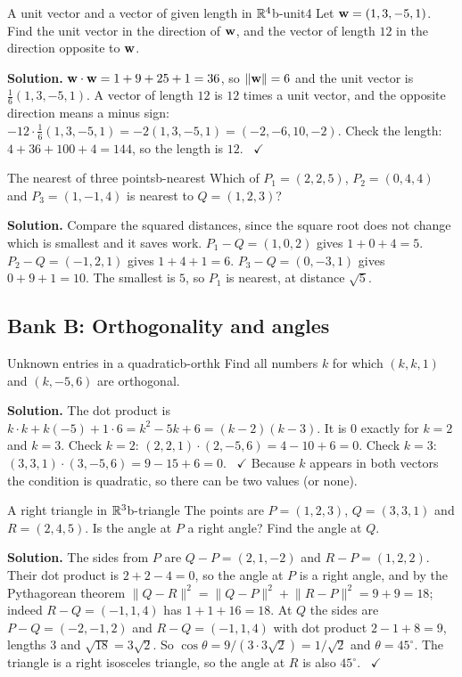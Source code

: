 \documentclass[11pt]{article}
\begin{document}
\begin{exmp}{A unit vector and a vector of given length in $\mathbb{R}^4$}{b-unit4}
Let $\mathbf{w}=(1,3,-5,1)$. Find the unit vector in the direction of $\mathbf{w}$, and the vector of length $12$ in the direction opposite to $\mathbf{w}$.

\textbf{Solution.} $\mathbf{w}\cdot\mathbf{w}=1+9+25+1=36$, so $\lVert\mathbf{w}\rVert=6$ and the unit vector is $\tfrac16(1,3,-5,1)$. A vector of length $12$ is $12$ times a unit vector, and the opposite direction means a minus sign: $-12\cdot\tfrac16(1,3,-5,1)=-2(1,3,-5,1)=(-2,-6,10,-2)$. Check the length: $4+36+100+4=144$, so the length is $12$. \ $\checkmark$
\end{exmp}

\begin{exmp}{The nearest of three points}{b-nearest}
Which of $P_1=(2,2,5)$, $P_2=(0,4,4)$ and $P_3=(1,-1,4)$ is nearest to $Q=(1,2,3)$?

\textbf{Solution.} Compare the squared distances, since the square root does not change which is smallest and it saves work. $P_1-Q=(1,0,2)$ gives $1+0+4=5$. $P_2-Q=(-1,2,1)$ gives $1+4+1=6$. $P_3-Q=(0,-3,1)$ gives $0+9+1=10$. The smallest is $5$, so $P_1$ is nearest, at distance $\sqrt5$.
\end{exmp}

\subsection*{Bank B: Orthogonality and angles}
\begin{exmp}{Unknown entries in a quadratic}{b-orthk}
Find all numbers $k$ for which $(k,k,1)$ and $(k,-5,6)$ are orthogonal.

\textbf{Solution.} The dot product is $k\cdot k+k(-5)+1\cdot6=k^2-5k+6=(k-2)(k-3)$. It is $0$ exactly for $k=2$ and $k=3$. Check $k=2$: $(2,2,1)\cdot(2,-5,6)=4-10+6=0$. Check $k=3$: $(3,3,1)\cdot(3,-5,6)=9-15+6=0$. \ $\checkmark$ Because $k$ appears in both vectors the condition is quadratic, so there can be two values (or none).
\end{exmp}

\begin{exmp}{A right triangle in $\mathbb{R}^3$}{b-triangle}
The points are $P=(1,2,3)$, $Q=(3,3,1)$ and $R=(2,4,5)$. Is the angle at $P$ a right angle? Find the angle at $Q$.

\textbf{Solution.} The sides from $P$ are $Q-P=(2,1,-2)$ and $R-P=(1,2,2)$. Their dot product is $2+2-4=0$, so the angle at $P$ is a right angle, and by the Pythagorean theorem $\lVert Q-R\rVert^2=\lVert Q-P\rVert^2+\lVert R-P\rVert^2=9+9=18$; indeed $R-Q=(-1,1,4)$ has $1+1+16=18$. At $Q$ the sides are $P-Q=(-2,-1,2)$ and $R-Q=(-1,1,4)$ with dot product $2-1+8=9$, lengths $3$ and $\sqrt{18}=3\sqrt2$. So $\cos\theta=9/(3\cdot3\sqrt2)=1/\sqrt2$ and $\theta=45^\circ$. The triangle is a right isosceles triangle, so the angle at $R$ is also $45^\circ$. \ $\checkmark$
\end{exmp}
\end{document}
